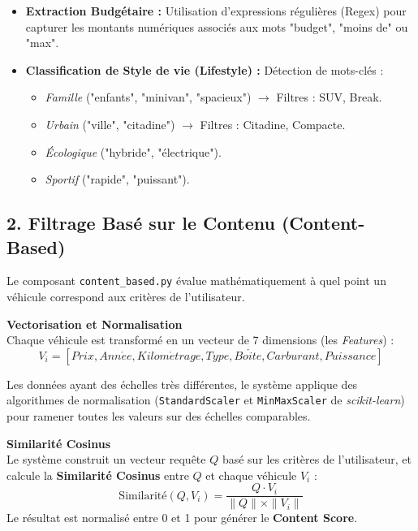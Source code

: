 \documentclass[a4paper, 11pt]{article}
\begin{document}
\begin{itemize}[label=\textbullet]
    \item \textbf{Extraction Budgétaire :} Utilisation d'expressions régulières (Regex) pour capturer les montants numériques associés aux mots "budget", "moins de" ou "max".
    \item \textbf{Classification de Style de vie (Lifestyle) :} Détection de mots-clés :
    \begin{itemize}
        \item \textit{Famille} ("enfants", "minivan", "spacieux") $\rightarrow$ Filtres : SUV, Break.
        \item \textit{Urbain} ("ville", "citadine") $\rightarrow$ Filtres : Citadine, Compacte.
        \item \textit{Écologique} ("hybride", "électrique").
        \item \textit{Sportif} ("rapide", "puissant").
    \end{itemize}
\end{itemize}

\vspace{0.2cm}

\subsection*{2. Filtrage Basé sur le Contenu (Content-Based)}
Le composant \texttt{content\_based.py} évalue mathématiquement à quel point un véhicule correspond aux critères de l'utilisateur.

\textbf{Vectorisation et Normalisation}\\
Chaque véhicule est transformé en un vecteur de 7 dimensions (les \textit{Features}) :
\begin{equation}
    V_i = [Prix, Ann\acute{e}e, Kilom\acute{e}trage, Type, Bo\hat{i}te, Carburant, Puissance]
\end{equation}

Les données ayant des échelles très différentes, le système applique des algorithmes de normalisation (\texttt{StandardScaler} et \texttt{MinMaxScaler} de \textit{scikit-learn}) pour ramener toutes les valeurs sur des échelles comparables.

\vspace{0.2cm}

\textbf{Similarité Cosinus}\\
Le système construit un vecteur requête $Q$ basé sur les critères de l'utilisateur, et calcule la \textbf{Similarité Cosinus} entre $Q$ et chaque véhicule $V_i$ :
\begin{equation}
    \text{Similarité}(Q, V_i) = \frac{Q \cdot V_i}{\|Q\| \times \|V_i\|}
\end{equation}
Le résultat est normalisé entre 0 et 1 pour générer le \textbf{Content Score}.
\end{document}
